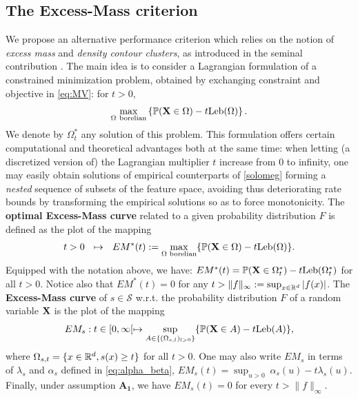 \subsection{The Excess-Mass criterion}
\label{resume_fr:em-curve}
We propose an alternative performance criterion which relies on the notion of \textit{excess mass} and \textit{density contour clusters}, as introduced in the seminal contribution \cite{Polonik95}. The main idea is to consider a Lagrangian formulation of a constrained minimization problem, obtained by exchanging constraint and objective in \eqref{eq:MV}: for $t>0$,
\begin{equation}
\label{resume_fr:solomeg}
\max_{\Omega~ \text{borelian}}  \left\{ \mathbb{P}(\mathbf X \in \Omega) - t \text{Leb}(\Omega) \right\}.
\end{equation}
We denote by $\Omega^*_t$ any solution of this problem. This formulation offers certain computational and theoretical advantages both at the same time: when letting (a discretized version of) the Lagrangian multiplier $t$ increase from $0$ to infinity, one may easily obtain solutions of empirical counterparts of \eqref{solomeg} forming a \textit{nested} sequence of subsets of the feature space, avoiding thus deteriorating rate bounds by transforming the empirical solutions so as to force monotonicity.
%
The \textbf{optimal Excess-Mass curve} related to a given probability distribution $F$ is defined as the plot of the mapping $$t>0~~\mapsto~~ EM^*(t):=\max_{\Omega\text{ borelian} } \{ {\mathbb{P}} (\mathbf X\in \Omega)-t\text{Leb}(\Omega) \}.$$ 
Equipped with the notation above, we have: $EM^*(t)=\mathbb{P}(\mathbf X \in \Omega_t^*)-t \text{Leb}(\Omega_t^*)$ for all $t>0$.
Notice also that $EM^*(t) = 0$ for any $t>\|f\|_\infty:=\sup_{x\in \mathbb{R}^d}\vert f(x)\vert$. 
%
The  \textbf{Excess-Mass curve} of $s\in\mathcal{S}$  w.r.t. the probability distribution $F$ of a random variable $\mathbf X$ is the plot of the mapping
\begin{equation}
\label{resume_fr:EM}
EM_s : t \in [0, \infty[ \mapsto \sup_{A \in \{(\Omega_{s,l})_{l>0}\}}\{ {\mathbb{P}}(\mathbf X \in A) - t \text{Leb}(A)\},
\end{equation}
where $\Omega_{s,t}=\{ x \in \mathbb{R}^d, s(x) \ge t \}$ for all $t>0$.
One may also write $EM_s$ in terms of $\lambda_s$ and $\alpha_s$ defined in \eqref{eq:alpha_beta}, $EM_s(t)= \sup_{u>0}~ \alpha_s(u) -t \lambda_s(u) $. Finally, under assumption $\mathbf{A_1}$, we have $EM_s(t)=0$ for every $t> \|f\|_\infty$. 
